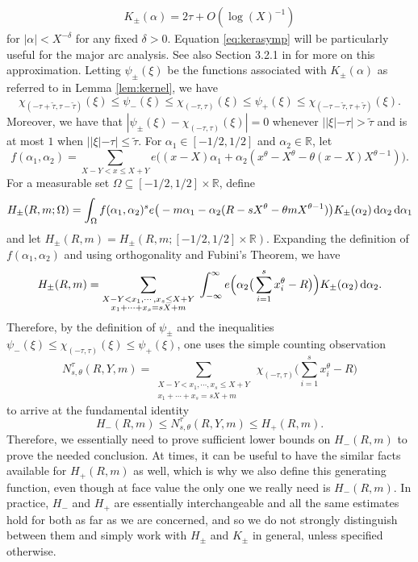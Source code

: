 \documentclass[11pt,reqno]{amsart}
\numberwithin{equation}{section}
\renewcommand{\d}{\,{\rm d}}
\begin{document}
\begin{align} \label{eq:kerasymp}
K_{\pm}(\alpha) = 2\tau+O(\log(X)^{-1}) 
\end{align}
for $|\alpha| < X^{-\delta}$ for any fixed $\delta > 0$. Equation \eqref{eq:kerasymp} will be particularly useful for the major arc analysis. 
See also Section 3.2.1 in \cite{Poulthesis} for more on this approximation. 
Letting $\psi_{\pm}(\xi)$ be the functions associated with $K_{\pm}(\alpha)$ as referred to in Lemma \ref{lem:kernel}, we have 
\[ \chi_{(-\tau+\tilde{\tau},\tau-\tilde{\tau})} (\xi) \leq \psi_-(\xi) \leq \chi_{(-\tau,\tau)}(\xi) \leq \psi_+(\xi) \leq \chi_{(-\tau-\tilde{\tau},\tau+\tilde{\tau})}(\xi). \]
Moreover, we have that $|\psi_{\pm}(\xi)-\chi_{(-\tau,\tau)}(\xi)| = 0$ whenever $||\xi|-\tau|>\tilde{\tau}$ and is at most $1$ when $||\xi|-\tau|\leq \tilde{\tau}$. 
For $\alpha_1 \in [-1/2,1/2]$ and $\alpha_2 \in \mathbb{R}$, let 
\[ f(\alpha_1,\alpha_2) = \sum_{X-Y < x \leq X+Y} e\big((x-X)\alpha_1+\alpha_2(x^{\theta}-X^{\theta}-\theta (x-X)X^{\theta-1})\big). \]
For a measurable set $\Omega \subseteq [-1/2,1/2]\times \mathbb{R}$, define 
\[ H_{\pm}(R,m;\Omega) = \int_{\Omega} f(\alpha_1,\alpha_2)^se\big(-m\alpha_1-\alpha_2(R-sX^{\theta}-\theta mX^{\theta-1})\big)K_{\pm}(\alpha_2)\d\alpha_2 \d\alpha_1 \]
and let $H_{\pm}(R,m) = H_{\pm}(R,m;[-1/2,1/2]\times \mathbb{R})$. Expanding the definition of $f(\alpha_1, \alpha_2)$ and using orthogonality and Fubini's Theorem, we have 
\[ H_{\pm}(R,m) = \sum_{\substack{X-Y < x_1,\cdots,x_s \leq X+Y \\ x_1+\cdots+x_s=sX+m}} \; \int_{-\infty}^{\infty} e\Big(\alpha_2\big(\sum_{i=1}^s x_i^{\theta}-R\big)\Big)K_{\pm}(\alpha_2)\d\alpha_2. \]
Therefore, by the definition of $\psi_{\pm}$ and the inequalities $\psi_-(\xi) \leq \chi_{(-\tau,\tau)}(\xi) \leq \psi_+(\xi)$, one uses the simple counting observation 
\[ N_{s,\theta}^{\tau}(R,Y,m) = \sum_{\substack{X-Y < x_1,\cdots,x_s \leq X+Y \\ x_1+\cdots+x_s=sX+m}} \, \chi_{(-\tau,\tau)}\Big(\sum_{i=1}^s x_i^{\theta}-R\Big) \]
to arrive at the fundamental identity 
\[ H_-(R,m) \leq N_{s,\theta}^{\tau}(R,Y,m) \leq H_+(R,m). \]
Therefore, we essentially need to prove sufficient lower bounds on $H_-(R,m)$ to prove the needed conclusion. At times, it can be useful to have the similar facts available for $H_+(R,m)$ as well, which is why we also define this generating function, even though at face value the only one we really need is $H_-(R,m)$. In practice, $H_-$ and $H_+$ are essentially interchangeable and all the same estimates hold for both as far as we are concerned, and so we do not strongly distinguish between them and simply work with $H_{\pm}$ and $K_{\pm}$ in general, unless specified otherwise. 
\end{document}
